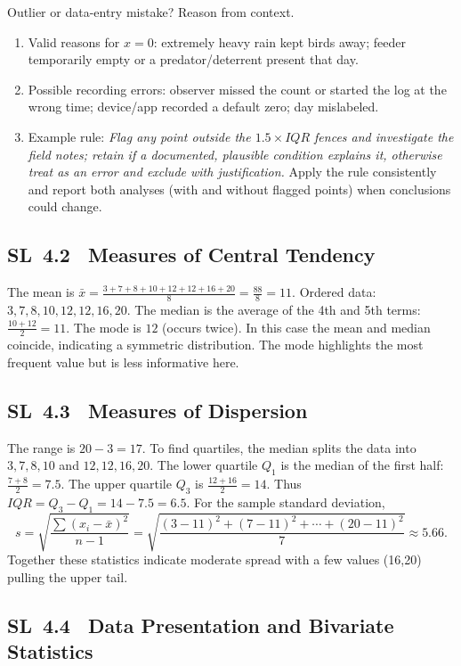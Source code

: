 \documentclass[11pt]{article}
\def\textbf#1{#1}%
\def\mathrm#1{#1}%
\newcommand{\tocsubsection}[1]{\subsection{#1}}
\begin{document}
\begin{solution}
\textbf{Outlier or data-entry mistake? Reason from context.}
\begin{enumerate}
  \item Valid reasons for $x=0$: extremely heavy rain kept birds away; feeder temporarily empty or a predator/deterrent present that day.
  \item Possible recording errors: observer missed the count or started the log at the wrong time; device/app recorded a default zero; day mislabeled.
  \item Example rule: \emph{Flag any point outside the $1.5\times\mathrm{IQR}$ fences and investigate the field notes; retain if a documented, plausible condition explains it, otherwise treat as an error and exclude with justification.} Apply the rule consistently and report both analyses (with and without flagged points) when conclusions could change.
\end{enumerate}
\end{solution}



\tocsubsection{SL 4.2 \; Measures of Central Tendency}

\begin{solution}
The mean is
\(\bar{x}=\frac{3+7+8+10+12+12+16+20}{8}=\frac{88}{8}=11\).  Ordered data:
$3,7,8,10,12,12,16,20$.  The median is the average of the 4th and 5th terms:
\(\tfrac{10+12}{2}=11\).  The mode is $12$ (occurs twice).  In this case the
mean and median coincide, indicating a symmetric distribution.  The mode
highlights the most frequent value but is less informative here.
\end{solution}

\tocsubsection{SL 4.3 \; Measures of Dispersion}

\begin{solution}
The range is $20-3=17$.  To find quartiles, the median splits the data into
\(3,7,8,10\) and \(12,12,16,20\).  The lower quartile $Q_1$ is the median of
the first half: $\tfrac{7+8}{2}=7.5$.  The upper quartile $Q_3$ is
\(\tfrac{12+16}{2}=14\).  Thus $\mathrm{IQR}=Q_3-Q_1=14-7.5=6.5$.
For the sample standard deviation,
\[s=\sqrt{\frac{\sum (x_i-\bar{x})^2}{n-1}}
  =\sqrt{\frac{(3-11)^2+(7-11)^2+\cdots+(20-11)^2}{7}}\approx5.66.
\]
Together these statistics indicate moderate spread with a few values (16,20)
pulling the upper tail.
\end{solution}

\tocsubsection{SL 4.4 \; Data Presentation and Bivariate Statistics}
\end{document}
